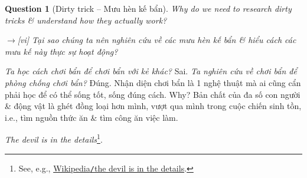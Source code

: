 \documentclass[12pt,twoside]{book}
\newtheorem{question}{Question}
\begin{document}
\begin{question}[Dirty trick -- Mưu hèn kế bẩn]
	Why do we need to research dirty tricks \& understand how they actually work?
	
	{\sf[en]$\to$[vi]} Tại sao chúng ta nên nghiên cứu về các mưu hèn kế bẩn \& hiểu cách các mưu kế này thực sự hoạt động?
\end{question}
{\it Ta học cách chơi bẩn để chơi bẩn với kẻ khác?} Sai. {\it Ta nghiên cứu về chơi bẩn để phòng chống chơi bẩn?} Đúng. Nhận diện chơi bẩn là 1 nghệ thuật mà ai cũng cẩn phải học để có thể sống tốt, sống đúng cách. Why? Bản chất của đa số con người \& động vật là ghét đồng loại hơn mình, vượt qua mình trong cuộc chiến sinh tồn, i.e., tìm nguồn thức ăn \& tìm công ăn việc làm.


{\it The devil is in the details}\footnote{See, e.g., \href{https://en.wikipedia.org/wiki/The_devil_is_in_the_details}{Wikipedia{\tt/}the devil is in the details}.}.
\end{document}
